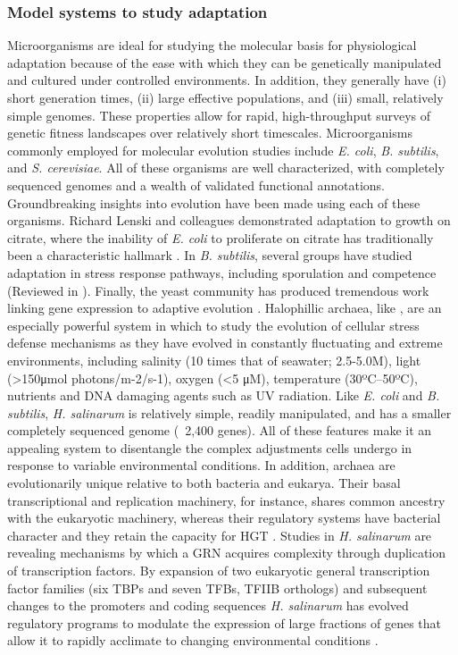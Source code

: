 \subsubsection{Model systems to study adaptation}

Microorganisms are ideal for studying the molecular basis for physiological adaptation because of the ease with which they can be genetically manipulated and cultured under controlled environments.  In addition, they generally have (i) short generation times, (ii) large effective populations, and (iii) small, relatively simple genomes. These properties allow for rapid, high-throughput surveys of genetic fitness landscapes over relatively short timescales.  Microorganisms commonly employed for molecular evolution studies include \textit{E. coli}, \textit{B. subtilis}, and \textit{S. cerevisiae}. All of these organisms are well characterized, with completely sequenced genomes and a wealth of validated functional annotations.  Groundbreaking insights into evolution have been made using each of these organisms. Richard Lenski and colleagues demonstrated adaptation to growth on citrate, where the inability of \textit{E. coli} to proliferate on citrate has traditionally been a characteristic hallmark \cite{blount_historical_2008}. In \textit{B. subtilis}, several groups have studied adaptation in stress response pathways, including sporulation and competence (Reviewed in \cite{hamoen_controlling_2003,errington_regulation_2003}). Finally, the yeast community has produced tremendous work linking gene expression to adaptive evolution \cite{ferea_systematic_1999}.  Halophillic archaea, like \halo, are an especially powerful system in which to study the evolution of cellular stress defense mechanisms as they have evolved in constantly fluctuating and extreme environments, including salinity (10 times that of seawater; 2.5-5.0M), light (>150μmol photons/m-2/s-1), oxygen (<5 μM), temperature (30ºC–50ºC), nutrients and DNA damaging agents such as UV radiation. Like \textit{E. coli} and \textit{B. subtilis}, \textit{H. salinarum} is relatively simple, readily manipulated, and has a smaller completely sequenced genome (~2,400 genes). All of these features make it an appealing system to disentangle the complex adjustments cells undergo in response to variable environmental conditions. In addition, archaea are evolutionarily unique relative to both bacteria and eukarya.  Their basal transcriptional and replication machinery, for instance, shares common ancestry with the eukaryotic machinery, whereas their regulatory systems have bacterial character and they retain the capacity for HGT \cite{baliga_is_2000,geiduschek_archaeal_2005,edgell_archaea_1997}.  Studies in \textit{H. salinarum} are revealing mechanisms by which a GRN acquires complexity through duplication of transcription factors.  By expansion of two eukaryotic general transcription factor families (six TBPs and seven TFBs, TFIIB orthologs) and subsequent changes to the promoters and coding sequences \textit{H. salinarum} has evolved regulatory programs to modulate the expression of large fractions of genes that allow it to rapidly acclimate to changing environmental conditions \cite{whitehead_diurnally_2009,facciotti_general_2007,schmid_single_2009}. 


